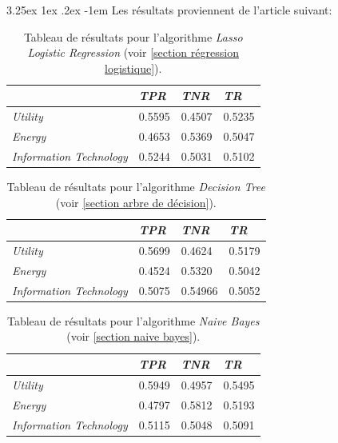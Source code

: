 \documentclass[a4paper, 11pt]{article}
\makeatletter
\newcounter{subsubsubsection}[subsubsection]
\renewcommand\paragraph{\@startsection{paragraph}{5}{\z@}%
  {3.25ex \@plus1ex \@minus.2ex}%
  {-1em}%
  {\normalfont\normalsize\bfseries}}
\makeatother
\begin{document}
\paragraph{}
Les résultats proviennent de l'article suivant: \cite{machine_learning_automated_trading}

\begin{table}[h!]
	\centering
\begin{tabular}{|l|l|l|l|}
	\hline
	\ & \textit{TPR} & \textit{TNR} & \textit{TR}\\
	\hline
	\textit{Utility} & 0.5595 & 0.4507 & 0.5235 \\
	\hline
	\textit{Energy} & 0.4653 & 0.5369 & 0.5047\\
	\hline
	\textit{Information Technology} & 0.5244 & 0.5031 & 0.5102\\
	\hline
\end{tabular}
\caption[]{Tableau de résultats pour l'algorithme \textit{Lasso Logistic Regression} (voir \ref{section régression logistique}).}
\end{table}



\begin{table}[h!]
	\centering
\begin{tabular}{|l|l|l|l|}
	\hline
	\ & \textit{TPR} & \textit{TNR} & \textit{TR}\\
	\hline
	\textit{Utility} & 0.5699 & 0.4624 & 0.5179 \\
	\hline
	\textit{Energy} & 0.4524 & 0.5320 & 0.5042\\
	\hline
	\textit{Information Technology} & 0.5075 & 0.54966 & 0.5052\\
	\hline
\end{tabular}
\caption[]{Tableau de résultats pour l'algorithme \textit{Decision Tree} (voir \ref{section arbre de décision}).}
\end{table}



\begin{table}[h!]
	\centering
\begin{tabular}{|l|l|l|l|}
	\hline
	\ & \textit{TPR} & \textit{TNR} & \textit{TR}\\
	\hline
	\textit{Utility} & 0.5949 & 0.4957 & 0.5495 \\
	\hline
	\textit{Energy} & 0.4797 & 0.5812 & 0.5193\\
	\hline
	\textit{Information Technology} & 0.5115 & 0.5048 & 0.5091\\
	\hline
\end{tabular}
\caption[]{Tableau de résultats pour l'algorithme \textit{Naive Bayes} (voir \ref{section naive bayes}).}
\end{table}
\end{document}
